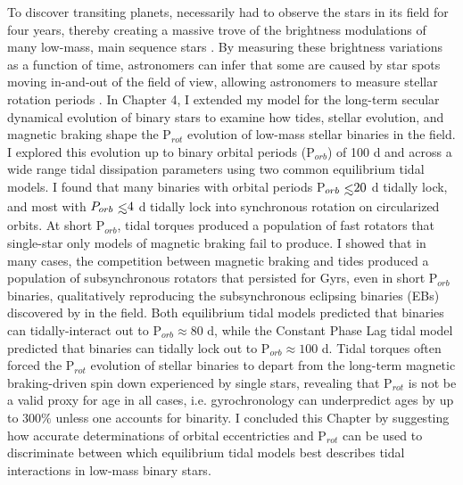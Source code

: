 To discover transiting planets, \kepler necessarily had to observe the stars in its field for four years, thereby creating a massive trove of the brightness modulations of many low-mass, main sequence stars \citep{Borucki2003,Borucki2010}. By measuring these brightness variations as a function of time, astronomers can infer that some are caused by star spots moving in-and-out of the field of view, allowing astronomers to measure stellar rotation periods \citep[P$_{rot}$, see][]{McQuillan2014}. In Chapter 4, I extended my model for the long-term secular dynamical evolution of binary stars to examine how tides, stellar evolution, and magnetic braking shape the P$_{rot}$ evolution of low-mass stellar binaries in the \kepler field. I explored this evolution up to binary orbital periods (P$_{orb}$) of 100 d and across a wide range tidal dissipation parameters using two common equilibrium tidal models. I found that many binaries with orbital periods P$_{orb} \lsim 20$ d tidally lock, and most with $P_{orb} \lsim 4$ d tidally lock into synchronous rotation on circularized orbits. At short P$_{orb}$, tidal torques produced a population of fast rotators that single-star only models of magnetic braking fail to produce.  I showed that in many cases, the competition between magnetic braking and tides produced a population of subsynchronous rotators that persisted for Gyrs, even in short P$_{orb}$ binaries, qualitatively reproducing the subsynchronous eclipsing binaries (EBs) discovered by \citet{Lurie2017} in the \kepler field. Both equilibrium tidal models predicted that binaries can tidally-interact out to P$_{orb} \approx 80$ d, while the Constant Phase Lag tidal model predicted that binaries can tidally lock out to P$_{orb} \approx 100$ d. Tidal torques often forced the P$_{rot}$ evolution of stellar binaries to depart from the long-term magnetic braking-driven spin down experienced by single stars, revealing that P$_{rot}$ is not be a valid proxy for age in all cases, i.e. gyrochronology can underpredict ages by up to $300\%$ unless one accounts for binarity. I concluded this Chapter by suggesting how accurate determinations of orbital eccentricties and P$_{rot}$ can be used to discriminate between which equilibrium tidal models best describes tidal interactions in low-mass binary stars.
 
